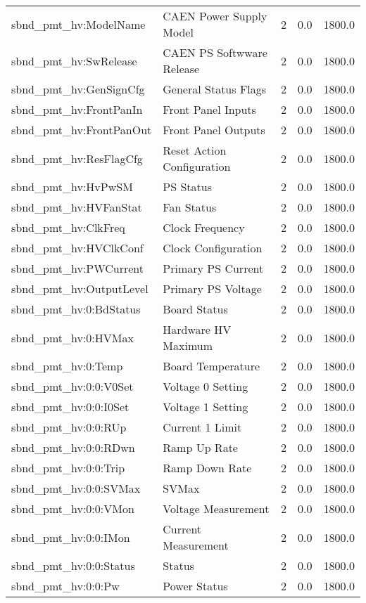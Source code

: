 \begin{center}
\begin{longtable}{l | l l l l }
sbnd\_pmt\_hv:ModelName & CAEN Power Supply Model & 2 & 0.0 & 1800.0\\ 
sbnd\_pmt\_hv:SwRelease & CAEN PS Softwware Release & 2 & 0.0 & 1800.0\\ 
sbnd\_pmt\_hv:GenSignCfg & General Status Flags & 2 & 0.0 & 1800.0\\ 
sbnd\_pmt\_hv:FrontPanIn & Front Panel Inputs & 2 & 0.0 & 1800.0\\ 
sbnd\_pmt\_hv:FrontPanOut & Front Panel Outputs & 2 & 0.0 & 1800.0\\ 
sbnd\_pmt\_hv:ResFlagCfg & Reset Action Configuration & 2 & 0.0 & 1800.0\\ 
sbnd\_pmt\_hv:HvPwSM & PS Status & 2 & 0.0 & 1800.0\\ 
sbnd\_pmt\_hv:HVFanStat & Fan Status & 2 & 0.0 & 1800.0\\ 
sbnd\_pmt\_hv:ClkFreq & Clock Frequency & 2 & 0.0 & 1800.0\\ 
sbnd\_pmt\_hv:HVClkConf & Clock Configuration & 2 & 0.0 & 1800.0\\ 
sbnd\_pmt\_hv:PWCurrent & Primary PS Current & 2 & 0.0 & 1800.0\\ 
sbnd\_pmt\_hv:OutputLevel & Primary PS Voltage & 2 & 0.0 & 1800.0\\ 
sbnd\_pmt\_hv:0:BdStatus & Board Status & 2 & 0.0 & 1800.0\\ 
sbnd\_pmt\_hv:0:HVMax & Hardware HV Maximum & 2 & 0.0 & 1800.0\\ 
sbnd\_pmt\_hv:0:Temp & Board Temperature & 2 & 0.0 & 1800.0\\ 
sbnd\_pmt\_hv:0:0:V0Set & Voltage 0 Setting & 2 & 0.0 & 1800.0\\ 
sbnd\_pmt\_hv:0:0:I0Set & Voltage 1 Setting & 2 & 0.0 & 1800.0\\ 
sbnd\_pmt\_hv:0:0:RUp & Current 1 Limit & 2 & 0.0 & 1800.0\\ 
sbnd\_pmt\_hv:0:0:RDwn & Ramp Up Rate & 2 & 0.0 & 1800.0\\ 
sbnd\_pmt\_hv:0:0:Trip & Ramp Down Rate & 2 & 0.0 & 1800.0\\ 
sbnd\_pmt\_hv:0:0:SVMax & SVMax & 2 & 0.0 & 1800.0\\ 
sbnd\_pmt\_hv:0:0:VMon & Voltage Measurement & 2 & 0.0 & 1800.0\\ 
sbnd\_pmt\_hv:0:0:IMon & Current Measurement & 2 & 0.0 & 1800.0\\ 
sbnd\_pmt\_hv:0:0:Status & Status & 2 & 0.0 & 1800.0\\ 
sbnd\_pmt\_hv:0:0:Pw & Power Status & 2 & 0.0 & 1800.0\\ 

\end{longtable}
\end{center}
